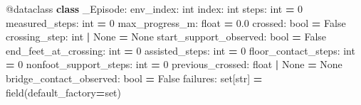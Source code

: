 \documentclass[
  american,
  11pt,
  letterpaper,
]{article}
\newenvironment{Shaded}{\begin{snugshade}}{\end{snugshade}}
\newcommand{\AttributeTok}[1]{\textcolor[rgb]{0.13,0.29,0.53}{#1}}
\newcommand{\BuiltInTok}[1]{#1}
\newcommand{\DecValTok}[1]{\textcolor[rgb]{0.00,0.00,0.81}{#1}}
\newcommand{\FloatTok}[1]{\textcolor[rgb]{0.00,0.00,0.81}{#1}}
\newcommand{\KeywordTok}[1]{\textcolor[rgb]{0.13,0.29,0.53}{\textbf{#1}}}
\newcommand{\NormalTok}[1]{#1}
\newcommand{\OperatorTok}[1]{\textcolor[rgb]{0.81,0.36,0.00}{\textbf{#1}}}
\newcommand{\VariableTok}[1]{\textcolor[rgb]{0.00,0.00,0.00}{#1}}
\renewenvironment{Shaded}{\par\smallskip}{\par\smallskip}
\begin{document}
\begin{Shaded}
\begin{Highlighting}[]
\AttributeTok{@dataclass}
\KeywordTok{class}\NormalTok{ \_Episode:}
\NormalTok{    env\_index: }\BuiltInTok{int}
\NormalTok{    index: }\BuiltInTok{int}
\NormalTok{    steps: }\BuiltInTok{int} \OperatorTok{=} \DecValTok{0}
\NormalTok{    measured\_steps: }\BuiltInTok{int} \OperatorTok{=} \DecValTok{0}
\NormalTok{    max\_progress\_m: }\BuiltInTok{float} \OperatorTok{=} \FloatTok{0.0}
\NormalTok{    crossed: }\BuiltInTok{bool} \OperatorTok{=} \VariableTok{False}
\NormalTok{    crossing\_step: }\BuiltInTok{int} \OperatorTok{|} \VariableTok{None} \OperatorTok{=} \VariableTok{None}
\NormalTok{    start\_support\_observed: }\BuiltInTok{bool} \OperatorTok{=} \VariableTok{False}
\NormalTok{    end\_feet\_at\_crossing: }\BuiltInTok{int} \OperatorTok{=} \DecValTok{0}
\NormalTok{    assisted\_steps: }\BuiltInTok{int} \OperatorTok{=} \DecValTok{0}
\NormalTok{    floor\_contact\_steps: }\BuiltInTok{int} \OperatorTok{=} \DecValTok{0}
\NormalTok{    nonfoot\_support\_steps: }\BuiltInTok{int} \OperatorTok{=} \DecValTok{0}
\NormalTok{    previous\_crossed: }\BuiltInTok{float} \OperatorTok{|} \VariableTok{None} \OperatorTok{=} \VariableTok{None}
\NormalTok{    bridge\_contact\_observed: }\BuiltInTok{bool} \OperatorTok{=} \VariableTok{False}
\NormalTok{    failures: }\BuiltInTok{set}\NormalTok{[}\BuiltInTok{str}\NormalTok{] }\OperatorTok{=}\NormalTok{ field(default\_factory}\OperatorTok{=}\BuiltInTok{set}\NormalTok{)}


\end{Highlighting}
\end{Shaded}
\end{document}
